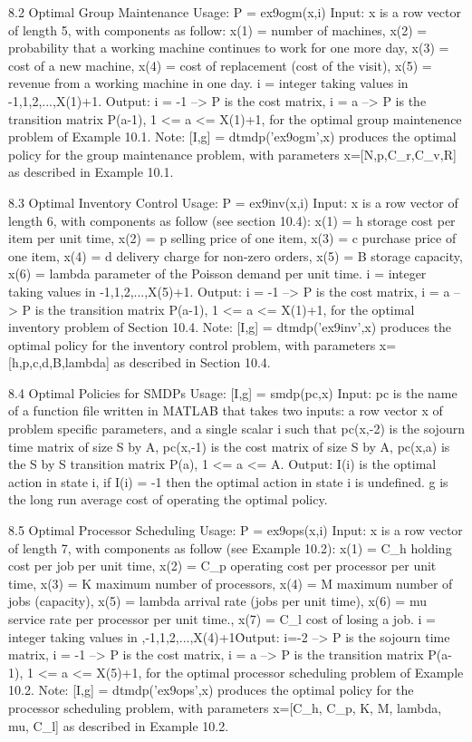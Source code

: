  

8.2 Optimal Group Maintenance 
Usage:  P = ex9ogm(x,i)
Input: x is a row vector of length 5, with components as follow: 
x(1) =   number of machines,
x(2) = probability that a working machine continues to work for one more day,
x(3) =  cost of a new machine,
x(4) =  cost of replacement (cost of the visit),
x(5) = revenue from a working machine in one day.
i =  integer taking values in {-1,1,2,...,X(1)+1}.
Output:  i = -1 --> P  is the cost matrix, 
i = a --> P is the transition matrix P(a-1), 1 <= a <= X(1)+1,
for the optimal group maintenence problem of Example 10.1.
Note:  [I,g] = dtmdp('ex9ogm',x) produces the optimal policy for the group maintenance problem, with parameters x=[N,p,C_r,C_v,R] as described in Example 10.1. 

8.3 Optimal Inventory Control 
Usage:  P = ex9inv(x,i)
Input: x is a row vector of length 6, with components as follow (see section 10.4): 
x(1) = h  storage cost per item per unit time,
x(2) = p selling price of one item,
x(3) = c purchase price of one item,
x(4) = d delivery charge for non-zero orders,
x(5) = B storage capacity,
x(6) = lambda parameter of the Poisson demand per unit time.
i =  integer taking values in {-1,1,2,...,X(5)+1}.
Output:  i = -1 --> P  is the cost matrix, 
i = a --> P is the transition matrix P(a-1), 1 <= a <= X(1)+1,
for the optimal inventory problem of Section 10.4.
Note:  [I,g] = dtmdp('ex9inv',x) produces the optimal policy for the inventory control problem, with parameters x=[h,p,c,d,B,lambda] as described in Section 10.4. 

8.4 Optimal Policies for SMDPs 
Usage:  [I,g] = smdp(pc,x)
Input: pc is the name of a function file written in MATLAB that takes two inputs: a row vector x of problem specific parameters, and a single scalar i such that 
pc(x,-2) is the sojourn time matrix of size S by A,
pc(x,-1) is the cost matrix of size S by A, 
pc(x,a) is the S by S transition matrix P(a), 1 <= a <= A.
Output: I(i) is the optimal action in state i, if I(i) = -1 then the 
optimal action in state i is undefined. g is the long run average cost of 
operating the optimal policy.

8.5 Optimal Processor Scheduling 
Usage:  P = ex9ops(x,i)
Input: x is a row vector of length 7, with components as follow (see Example 10.2): 
x(1) = C_h  holding  cost per job per unit time,
x(2) = C_p operating cost per processor per unit time,
x(3) = K maximum number of processors,
x(4) = M maximum number of jobs (capacity),
x(5) = lambda arrival rate (jobs per unit time),
x(6) = mu service rate per processor per unit time.,
x(7) = C_l cost of losing a job.
i =  integer taking values in ,-1,1,2,...,X(4)+1\.
Output: i=-2 --> P is the sojourn time matrix,
i = -1 --> P  is the cost matrix, 
i = a --> P is the transition matrix P(a-1), 1 <= a <= X(5)+1,
for the optimal processor scheduling  problem of Example 10.2.
Note:  [I,g] = dtmdp('ex9ops',x) produces the optimal policy for the processor scheduling problem, with parameters x=[C_h, C_p, K, M, lambda, mu, C_l] as described in Example 10.2.  

